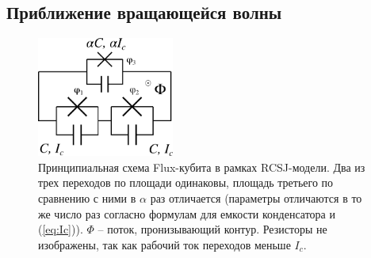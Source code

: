 \documentclass[12pt, twoside]{report}
\numberwithin{equation}{section}
\numberwithin{figure}{section}
\begin{document}
\subsection{Приближение вращающейся волны} \label{subsec:rwa}



\iffalse
\begin{figure}
\centering
\includegraphics[width=0.4\textwidth]{Pictures/qubit}
\caption{Принципиальная схема Flux-кубита в рамках RCSJ-модели. Два из трех переходов по площади одинаковы, площадь третьего по сравнению с ними в $\alpha$ раз отличается (параметры отличаются в то же число раз согласно формулам для емкости конденсатора и (\ref{eq:Ic})). $\Phi$ -- поток, пронизывающий контур. Резисторы не изображены, так как рабочий ток переходов меньше $I_c$.}
\label{fig:qubit}
\end{figure}
\end{document}
